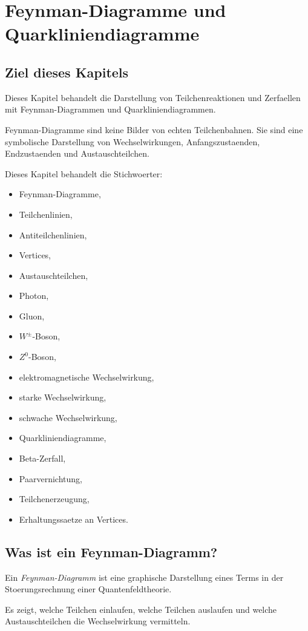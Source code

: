 \chapter{Feynman-Diagramme und Quarkliniendiagramme}

\section{Ziel dieses Kapitels}

Dieses Kapitel behandelt die Darstellung von Teilchenreaktionen und Zerfaellen mit
Feynman-Diagrammen und Quarkliniendiagrammen.

Feynman-Diagramme sind keine Bilder von echten Teilchenbahnen.
Sie sind eine symbolische Darstellung von Wechselwirkungen, Anfangszustaenden,
Endzustaenden und Austauschteilchen.

\begin{notebox}
Dieses Kapitel behandelt die Stichwoerter:
\begin{itemize}
    \item Feynman-Diagramme,
    \item Teilchenlinien,
    \item Antiteilchenlinien,
    \item Vertices,
    \item Austauschteilchen,
    \item Photon,
    \item Gluon,
    \item $W^\pm$-Boson,
    \item $Z^0$-Boson,
    \item elektromagnetische Wechselwirkung,
    \item starke Wechselwirkung,
    \item schwache Wechselwirkung,
    \item Quarkliniendiagramme,
    \item Beta-Zerfall,
    \item Paarvernichtung,
    \item Teilchenerzeugung,
    \item Erhaltungssaetze an Vertices.
\end{itemize}
\end{notebox}

\section{Was ist ein Feynman-Diagramm?}

\begin{definitionbox}
Ein \emph{Feynman-Diagramm} ist eine graphische Darstellung eines Terms in der
Stoerungsrechnung einer Quantenfeldtheorie.

Es zeigt, welche Teilchen einlaufen, welche Teilchen auslaufen und welche
Austauschteilchen die Wechselwirkung vermitteln.
\end{definitionbox}

